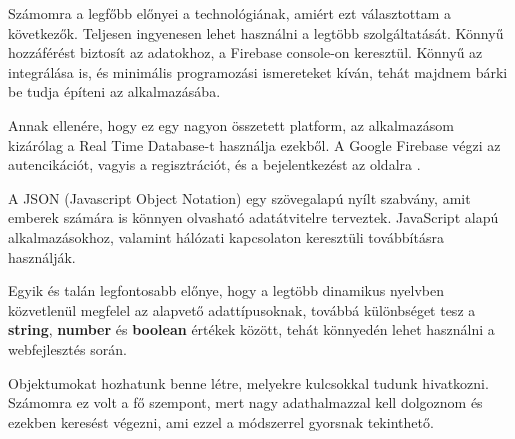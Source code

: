 Számomra a legfőbb előnyei a technológiának, amiért ezt választottam a következők. Teljesen ingyenesen lehet használni a legtöbb szolgáltatását. Könnyű hozzáférést biztosít az adatokhoz, a Firebase console-on keresztül. Könnyű az integrálása is, és minimális programozási ismereteket kíván, tehát majdnem bárki be tudja építeni az alkalmazásába.

Annak ellenére, hogy ez egy nagyon összetett platform, az alkalmazásom kizárólag a Real Time Database-t használja ezekből. A Google Firebase végzi az autencikációt, vagyis a regisztrációt, és a bejelentkezést az oldalra
\cite{firebase}.


A JSON (Javascript Object Notation) egy szövegalapú nyílt szabvány, amit emberek számára is könnyen olvasható adatátvitelre terveztek. JavaScript alapú alkalmazásokhoz, valamint hálózati kapcsolaton keresztüli továbbításra használják. 

Egyik és talán legfontosabb előnye, hogy a legtöbb dinamikus nyelvben közvetlenül megfelel az alapvető adattípusoknak, továbbá különbséget tesz a \textbf{string}, \textbf{number} és \textbf{boolean} értékek között, tehát könnyedén lehet használni a webfejlesztés során.

Objektumokat hozhatunk benne létre, melyekre kulcsokkal tudunk hivatkozni. Számomra ez volt a fő szempont, mert nagy adathalmazzal kell dolgoznom és ezekben keresést végezni, ami ezzel a módszerrel gyorsnak tekinthető.
